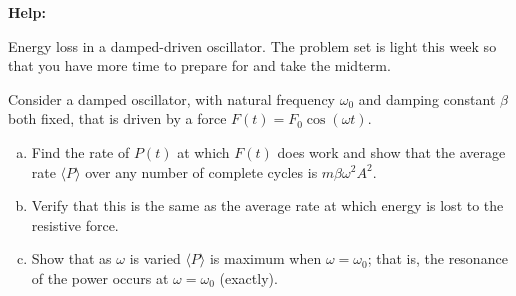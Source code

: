 \documentclass[11pt,letterpaper,boxed]{../hmcpsetrhino}
\begin{document}
\textbf{Help:}

\begin{problem}[i]
Energy loss in a damped-driven oscillator. The problem set is light this week so that you have more time to prepare for and take the midterm.

\begin{problem}
Consider a damped oscillator, with natural frequency $\omega_0$ and damping constant $\beta$ both fixed, that is driven by a force $F(t) = F_0 \cos (\omega t)$.

\begin{enumerate}[(a)]
\item Find the rate of $P(t)$ at which $F(t)$ does work and show that the average rate $\langle P \rangle$ over any number of complete cycles is $m \beta \omega^2 A^2$.

\item Verify that this is the same as the average rate at which energy is lost to the resistive force.

\item Show that as $\omega$ is varied $\langle P \rangle$ is maximum when $\omega = \omega_0$; that is, the resonance of the power occurs at $\omega = \omega_0$ (exactly).

\end{enumerate}
\end{problem}
\end{problem}
\begin{solution}


\vfill
\end{solution}
\end{document}
